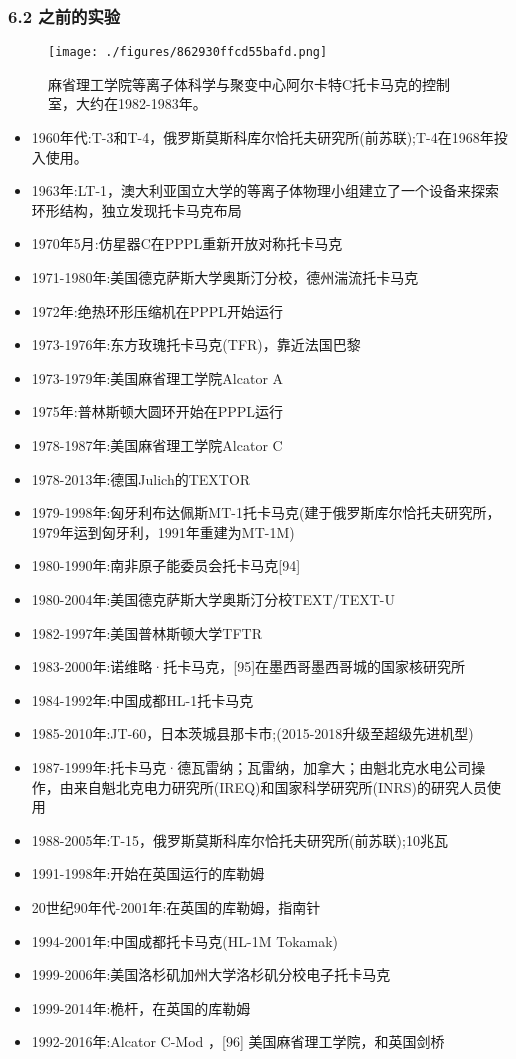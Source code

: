 \subsubsection{6.2 之前的实验}
\begin{figure}[ht]
\centering
\texttt{[image: ./figures/862930ffcd55bafd.png]}
\caption{麻省理工学院等离子体科学与聚变中心阿尔卡特C托卡马克的控制室，大约在1982-1983年。} \label{fig_TKMK_9}
\end{figure}
\begin{itemize}
\item 1960年代:T-3和T-4，俄罗斯莫斯科库尔恰托夫研究所(前苏联);T-4在1968年投入使用。
\item 1963年:LT-1，澳大利亚国立大学的等离子体物理小组建立了一个设备来探索环形结构，独立发现托卡马克布局
\item 1970年5月:仿星器C在PPPL重新开放对称托卡马克
\item 1971-1980年:美国德克萨斯大学奥斯汀分校，德州湍流托卡马克
\item 1972年:绝热环形压缩机在PPPL开始运行
\item 1973-1976年:东方玫瑰托卡马克(TFR)，靠近法国巴黎
\item 1973-1979年:美国麻省理工学院Alcator A
\item 1975年:普林斯顿大圆环开始在PPPL运行
\item 1978-1987年:美国麻省理工学院Alcator C
\item 1978-2013年:德国Julich的TEXTOR
\item 1979-1998年:匈牙利布达佩斯MT-1托卡马克(建于俄罗斯库尔恰托夫研究所，1979年运到匈牙利，1991年重建为MT-1M)
\item 1980-1990年:南非原子能委员会托卡马克[94]
\item 1980-2004年:美国德克萨斯大学奥斯汀分校TEXT/TEXT-U
\item 1982-1997年:美国普林斯顿大学TFTR
\item 1983-2000年:诺维略·托卡马克，[95]在墨西哥墨西哥城的国家核研究所
\item 1984-1992年:中国成都HL-1托卡马克
\item 1985-2010年:JT-60，日本茨城县那卡市;(2015-2018升级至超级先进机型)
\item 1987-1999年:托卡马克·德瓦雷纳；瓦雷纳，加拿大；由魁北克水电公司操作，由来自魁北克电力研究所(IREQ)和国家科学研究所(INRS)的研究人员使用
\item 1988-2005年:T-15，俄罗斯莫斯科库尔恰托夫研究所(前苏联);10兆瓦
\item 1991-1998年:开始在英国运行的库勒姆
\item 20世纪90年代-2001年:在英国的库勒姆，指南针
\item 1994-2001年:中国成都托卡马克(HL-1M Tokamak)
\item 1999-2006年:美国洛杉矶加州大学洛杉矶分校电子托卡马克
\item 1999-2014年:桅杆，在英国的库勒姆
\item 1992-2016年:Alcator C-Mod ，[96] 美国麻省理工学院，和英国剑桥
\end{itemize}
